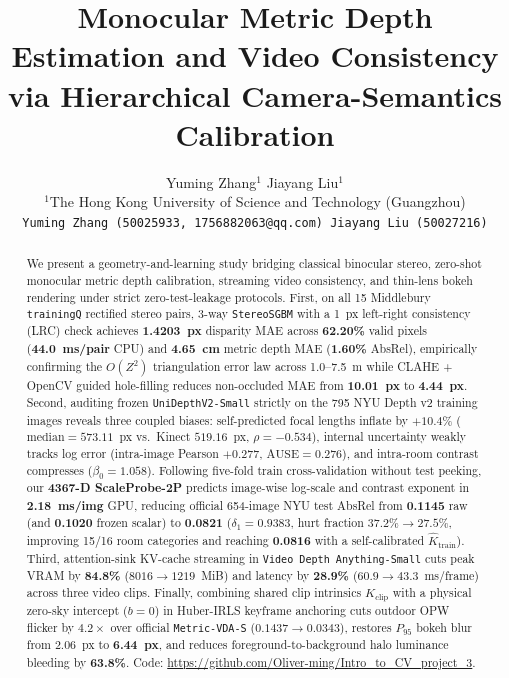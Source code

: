 \documentclass[10pt,twocolumn,letterpaper]{article}
\title{Monocular Metric Depth Estimation and Video Consistency\\via Hierarchical Camera-Semantics Calibration}
\author{
Yuming Zhang$^{1}$ \qquad Jiayang Liu$^{1}$\\
$^{1}$The Hong Kong University of Science and Technology (Guangzhou)\\
{\tt\small Yuming Zhang (50025933, 1756882063@qq.com) \quad Jiayang Liu (50027216)}
}
\begin{document}
\maketitle

\begin{abstract}
We present a geometry-and-learning study bridging classical binocular stereo, zero-shot monocular metric depth calibration, streaming video consistency, and thin-lens bokeh rendering under strict zero-test-leakage protocols. First, on all 15 Middlebury \texttt{trainingQ} rectified stereo pairs, 3-way \texttt{StereoSGBM} with a 1~px left-right consistency (LRC) check achieves \textbf{1.4203~px} disparity MAE across \textbf{62.20\%} valid pixels (\textbf{44.0~ms/pair} CPU) and \textbf{4.65~cm} metric depth MAE (\textbf{1.60\%} AbsRel), empirically confirming the $O(Z^2)$ triangulation error law across 1.0--7.5~m while CLAHE + OpenCV guided hole-filling reduces non-occluded MAE from \textbf{10.01~px} to \textbf{4.44~px}. Second, auditing frozen \texttt{UniDepthV2-Small} strictly on the 795 NYU Depth v2 training images reveals three coupled biases: self-predicted focal lengths inflate by $+10.4\%$ ($\mathrm{median}=573.11$~px vs.\ Kinect $519.16$~px, $\rho=-0.534$), internal uncertainty weakly tracks log error (intra-image Pearson $+0.277$, $\mathrm{AUSE}=0.276$), and intra-room contrast compresses ($\beta_0=1.058$). Following five-fold train cross-validation without test peeking, our \textbf{4367-D ScaleProbe-2P} predicts image-wise log-scale and contrast exponent in \textbf{2.18~ms/img} GPU, reducing official 654-image NYU test AbsRel from \textbf{0.1145} raw (and \textbf{0.1020} frozen scalar) to \textbf{0.0821} ($\delta_1=0.9383$, hurt fraction $37.2\%\to 27.5\%$, improving 15/16 room categories and reaching \textbf{0.0816} with a self-calibrated $\hat{K}_{\mathrm{train}}$). Third, attention-sink KV-cache streaming in \texttt{Video Depth Anything-Small} cuts peak VRAM by \textbf{84.8\%} ($8016\to 1219$~MiB) and latency by \textbf{28.9\%} ($60.9\to 43.3$~ms/frame) across three video clips. Finally, combining shared clip intrinsics $K_{\mathrm{clip}}$ with a physical zero-sky intercept ($b=0$) in Huber-IRLS keyframe anchoring cuts outdoor OPW flicker by $4.2\times$ over official \texttt{Metric-VDA-S} ($0.1437\to 0.0343$), restores $P_{95}$ bokeh blur from $2.06$~px to \textbf{6.44~px}, and reduces foreground-to-background halo luminance bleeding by \textbf{63.8\%}. Code: \url{https://github.com/Oliver-ming/Intro_to_CV_project_3}.
\end{abstract}
\end{document}
